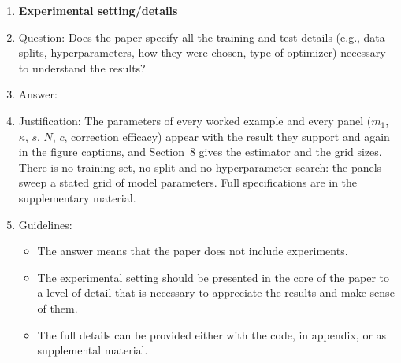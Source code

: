 \begin{enumerate}
\item {\bf Experimental setting/details}
    \item[] Question: Does the paper specify all the training and test details (e.g., data splits, hyperparameters, how they were chosen, type of optimizer) necessary to understand the results?
    \item[] Answer: \answerYes{}
    \item[] Justification: The parameters of every worked example and every panel ($m_1$, $\kappa$, $s$, $N$, $c$, correction efficacy) appear with the result they support and again in the figure captions, and Section~8 gives the estimator and the grid sizes. There is no training set, no split and no hyperparameter search: the panels sweep a stated grid of model parameters. Full specifications are in the supplementary material.
    \item[] Guidelines:
    \begin{itemize}
        \item The answer \answerNA{} means that the paper does not include experiments.
        \item The experimental setting should be presented in the core of the paper to a level of detail that is necessary to appreciate the results and make sense of them.
        \item The full details can be provided either with the code, in appendix, or as supplemental material.
    \end{itemize}


\end{enumerate}
